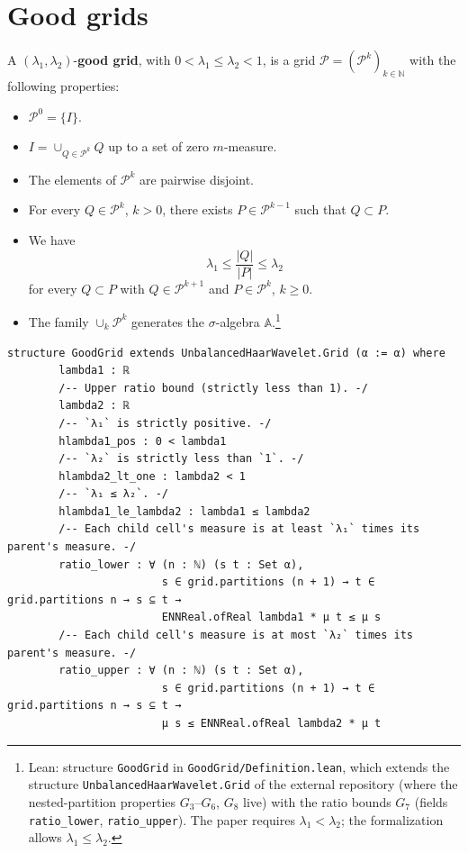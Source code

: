 \documentclass[11pt]{amsart}
\theoremstyle{definition}
\newcommand{\lean}[1]{\texttt{#1}}
\begin{document}
\section{Good grids}\label{goodgrids}

A $(\lambda_1,\lambda_2)$-{\bf good grid}, with $0<\lambda_1\leq
\lambda_2<1$, is a grid $\mathcal{P}=(\mathcal{P}^k)_{k\in \mathbb{N}}$ with
the following properties:
\begin{itemize}
\item[$G_3$.] $\mathcal{P}^0=\{I\}$.
\item[$G_4$.] $I=\cup_{Q \in \mathcal{P}^k} Q$ up to a set of zero
$m$-measure.
\item[$G_5$.] The elements of $\mathcal{P}^k$ are pairwise disjoint.
\item[$G_6$.] For every $Q\in \mathcal{P}^k$, $k>0$, there exists
$P \in \mathcal{P}^{k-1}$ such that $Q\subset P$.
\item[$G_7$.] We have
$$\lambda_1 \leq \frac{|Q|}{|P|} \leq \lambda_2$$
for every $Q\subset P$ with $Q\in \mathcal{P}^{k+1}$ and
$P\in \mathcal{P}^{k}$, $k\geq 0$.
\item[$G_8$.] The family $\cup_k \mathcal{P}^k$ generates the
$\sigma$-algebra $\mathbb{A}$.\footnote{Lean: structure \lean{GoodGrid} in \lean{GoodGrid/Definition.lean},
which extends the structure \lean{UnbalancedHaarWavelet.Grid} of the external
repository (where the nested-partition properties $G_3$--$G_6$, $G_8$ live)
with the ratio bounds $G_7$ (fields \lean{ratio\_lower},
\lean{ratio\_upper}). The paper requires $\lambda_1 < \lambda_2$; the
formalization allows $\lambda_1 \le \lambda_2$.}
\end{itemize}
\begin{lstlisting}[style=lean]
structure GoodGrid extends UnbalancedHaarWavelet.Grid (α := α) where
        lambda1 : ℝ
        /-- Upper ratio bound (strictly less than 1). -/
        lambda2 : ℝ
        /-- `λ₁` is strictly positive. -/
        hlambda1_pos : 0 < lambda1
        /-- `λ₂` is strictly less than `1`. -/
        hlambda2_lt_one : lambda2 < 1
        /-- `λ₁ ≤ λ₂`. -/
        hlambda1_le_lambda2 : lambda1 ≤ lambda2
        /-- Each child cell's measure is at least `λ₁` times its parent's measure. -/
        ratio_lower : ∀ (n : ℕ) (s t : Set α),
                        s ∈ grid.partitions (n + 1) → t ∈ grid.partitions n → s ⊆ t →
                        ENNReal.ofReal lambda1 * μ t ≤ μ s
        /-- Each child cell's measure is at most `λ₂` times its parent's measure. -/
        ratio_upper : ∀ (n : ℕ) (s t : Set α),
                        s ∈ grid.partitions (n + 1) → t ∈ grid.partitions n → s ⊆ t →
                        μ s ≤ ENNReal.ofReal lambda2 * μ t
\end{lstlisting}
\end{document}
